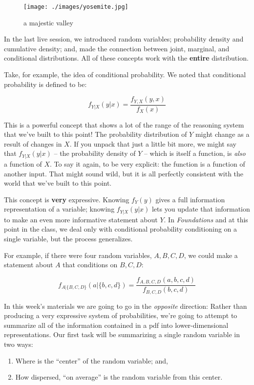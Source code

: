 \documentclass[
]{book}
\providecommand{\tightlist}{%
  \setlength{\itemsep}{0pt}\setlength{\parskip}{0pt}}
\theoremstyle{definition}
\theoremstyle{definition}
\theoremstyle{definition}
\theoremstyle{definition}
\theoremstyle{remark}
\begin{document}
\begin{figure}
\centering
\texttt{[image: ./images/yosemite.jpg]}
\caption{a majestic valley}
\end{figure}

In the last live session, we introduced random variables; probability density and cumulative density; and, made the connection between joint, marginal, and conditional distributions. All of these concepts work with the \textbf{entire} distribution.

Take, for example, the idea of conditional probability. We noted that conditional probability is defined to be:

\[
  f_{Y|X}(y|x) = \frac{f_{Y,X}(y,x)}{f_{X}(x)}
\]

This is a powerful concept that shows a lot of the range of the reasoning system that we've built to this point! The probability distribution of \(Y\) might change as a result of changes in \(X\). If you unpack that just a little bit more, we might say that \(f_{Y|X}(y|x)\) -- the probability density of \(Y\) -- which is itself a function, is \emph{also} a function of \(X\). To say it again, to be very explicit: the function is a function of another input. That might sound wild, but it is all perfectly consistent with the world that we've built to this point.

This concept is \textbf{very} expressive. Knowing \(f_{Y}(y)\) gives a full information representation of a variable; knowing \(f_{Y|X}(y|x)\) lets you update that information to make an even more informative statement about \(Y\). In \emph{Foundations} and at this point in the class, we deal only with conditional probability conditioning on a single variable, but the process generalizes.

For example, if there were four random variables, \(A, B, C, D\), we could make a statement about \(A\) that conditions on \(B, C, D\):

\[
  f_{A|\{B,C,D\}}(a|\{b,c,d\}) = \frac{f_{A,B,C,D}(a,b,c,d)}{f_{B,C,D}(b,c,d)}
\]

In this week's materials we are going to go in the \emph{opposite} direction: Rather than producing a very expressive system of probabilities, we're going to attempt to summarize all of the information contained in a pdf into lower-dimensional representations. Our first task will be summarizing a single random variable in two ways:

\begin{enumerate}
\def\labelenumi{\arabic{enumi}.}
\tightlist
\item
  Where is the ``center'' of the random variable; and,
\item
  How dispersed, ``on average'' is the random variable from this center.
\end{enumerate}
\end{document}

